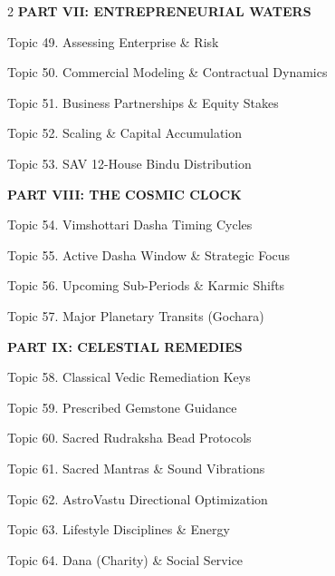 \documentclass[10pt,oneside]{article}
\renewcommand{\textls}[2][60]{#2}
\begin{document}
\begin{multicols}{2}
  {\sffamily\fontsize{8.5}{11}\selectfont\bfseries\color{ExecutiveNavy}\textls[60]{PART VII: ENTREPRENEURIAL WATERS}}\par
  \vspace{1mm}
  {\fontsize{8}{11.5}\selectfont
  Topic 49. Assessing Enterprise \& Risk \dotfill \pageref*{topic49}\par
  Topic 50. Commercial Modeling \& Contractual Dynamics \dotfill \pageref*{topic50}\par
  Topic 51. Business Partnerships \& Equity Stakes \dotfill \pageref*{topic51}\par
  Topic 52. Scaling \& Capital Accumulation \dotfill \pageref*{topic52}\par
  Topic 53. SAV 12-House Bindu Distribution \dotfill \pageref*{topic53}\par}
  \vspace{2.5mm}

  {\sffamily\fontsize{8.5}{11}\selectfont\bfseries\color{ExecutiveNavy}\textls[60]{PART VIII: THE COSMIC CLOCK}}\par
  \vspace{1mm}
  {\fontsize{8}{11.5}\selectfont
  Topic 54. Vimshottari Dasha Timing Cycles \dotfill \pageref*{topic54}\par
  Topic 55. Active Dasha Window \& Strategic Focus \dotfill \pageref*{topic55}\par
  Topic 56. Upcoming Sub-Periods \& Karmic Shifts \dotfill \pageref*{topic56}\par
  Topic 57. Major Planetary Transits (Gochara) \dotfill \pageref*{topic57}\par}
  \vspace{2.5mm}

  {\sffamily\fontsize{8.5}{11}\selectfont\bfseries\color{ExecutiveNavy}\textls[60]{PART IX: CELESTIAL REMEDIES}}\par
  \vspace{1mm}
  {\fontsize{8}{11.5}\selectfont
  Topic 58. Classical Vedic Remediation Keys \dotfill \pageref*{topic58}\par
  Topic 59. Prescribed Gemstone Guidance \dotfill \pageref*{topic59}\par
  Topic 60. Sacred Rudraksha Bead Protocols \dotfill \pageref*{topic60}\par
  Topic 61. Sacred Mantras \& Sound Vibrations \dotfill \pageref*{topic61}\par
  Topic 62. AstroVastu Directional Optimization \dotfill \pageref*{topic62}\par
  Topic 63. Lifestyle Disciplines \& Energy \dotfill \pageref*{topic63}\par
  Topic 64. Dana (Charity) \& Social Service \dotfill \pageref*{topic64}\par}


\end{multicols}
\end{document}
